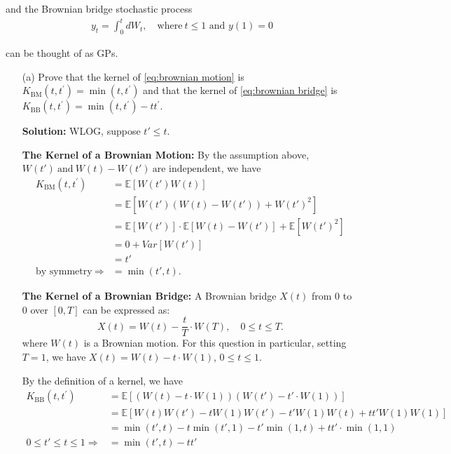 \documentclass[11pt]{article}
\theoremstyle{plain} %
\newenvironment{solution}
{\color{C2}\normalfont\begin{framed}\begingroup\textbf{Solution:} }
  {\endgroup\end{framed}}
\theoremstyle{remark}
\newcommand{\EE}{\mathbb{E}}
\begin{document}
and the Brownian bridge stochastic process
\begin{align}
y_{t}=\int_{0}^{t} d W_{t}, \quad \text{where} \ t \leq 1 \text{ and } y(1)=0
\label{eq:brownian bridge}
\end{align}

can be thought of as GPs.

\begin{enumerate}
    \item[(a)] Prove that the kernel of \cref{eq:brownian motion} is \( K_{\mathrm{BM}}\left(t,
    t^{\prime}\right)=\min \left(t, t^{\prime}\right) \) and that the kernel of
    \cref{eq:brownian bridge} is \( K_{\mathrm{BB}}\left(t, t^{\prime}\right)=\min \left(t,
    t^{\prime}\right)-t t^{\prime} \).
    \begin{solution}WLOG, suppose $t'\le t$.

      \textbf{The Kernel of a Brownian Motion:}  By the assumption above, 
      $W(t')~\text{and}~W(t)-W(t')~\text{are independent}$, we have
      \begin{align*}
        K_{\mathrm{BM}}\left(t, t^{\prime}\right)
        &=\EE[W(t')W(t)]\\
        &=\EE[W(t')(W(t)-W(t'))+W(t')^2]\\
        &=\EE[W(t')]\cdot\EE[W(t)-W(t')]+\EE[W(t')^2]\\
        &=0+Var[W(t')] \\
        &= t'\\
        \text{by symmetry}~\Longrightarrow&=\min(t',t).
        \end{align*}

        \textbf{The Kernel of a Brownian Bridge:} A Brownian bridge $X(t)$
        from $0$ to $0$ over $[0, T]$ can be
        expressed as: 
        $$
        X(t) = W(t) - \frac{t}{T}\cdot W(T), \quad 0\le t\le T.
        $$ 
        where $W(t)$ is a Brownian motion. For this question in particular,
        setting $T=1$, we have $X(t) = W(t) - t\cdot W(1)$, $0\le t\le 1$.
        
        By the definition of a kernel, we have
        \begin{align*}
          K_{\mathrm{BB}}\left(t, t^{\prime}\right)
          &=\mathbb{E}[(W(t) - t\cdot W(1))(W(t') - t'\cdot W(1))]\\
          &=\mathbb{E}[W(t)W(t') - tW(1)W(t') - t'W(1)W(t) + tt'W(1)W(1)]\\
          &=\min(t',t) - t\min(t',1) - t'\min(1,t) + tt'\cdot \min(1,1)\\
          0\le t'\le  t\le 1\Longrightarrow
          &=\min(t',t) - tt'
        \end{align*}
      

\end{solution}
\end{enumerate}
\end{document}
